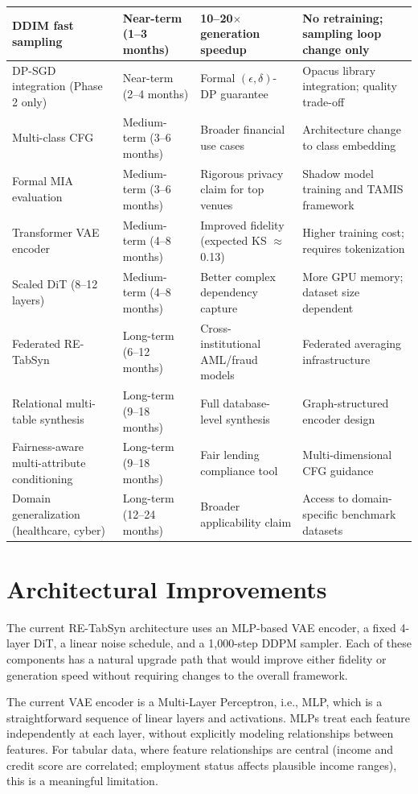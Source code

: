 \begin{xltabular}{\textwidth}{|X|X|X|X|}
DDIM fast sampling & Near-term (1--3 months) & 10--20$\times$ generation speedup & No retraining; sampling loop change only \\
\hline
DP-SGD integration (Phase 2 only) & Near-term (2--4 months) & Formal $(\epsilon, \delta)$-DP guarantee & Opacus library integration; quality trade-off \\
\hline
Multi-class CFG & Medium-term (3--6 months) & Broader financial use cases & Architecture change to class embedding \\
\hline
Formal MIA evaluation & Medium-term (3--6 months) & Rigorous privacy claim for top venues & Shadow model training and TAMIS framework \\
\hline
Transformer VAE encoder & Medium-term (4--8 months) & Improved fidelity (expected KS $\approx$ 0.13) & Higher training cost; requires tokenization \\
\hline
Scaled DiT (8--12 layers) & Medium-term (4--8 months) & Better complex dependency capture & More GPU memory; dataset size dependent \\
\hline
Federated RE-TabSyn & Long-term (6--12 months) & Cross-institutional AML/fraud models & Federated averaging infrastructure \\
\hline
Relational multi-table synthesis & Long-term (9--18 months) & Full database-level synthesis & Graph-structured encoder design \\
\hline
Fairness-aware multi-attribute conditioning & Long-term (9--18 months) & Fair lending compliance tool & Multi-dimensional CFG guidance \\
\hline
Domain generalization (healthcare, cyber) & Long-term (12--24 months) & Broader applicability claim & Access to domain-specific benchmark datasets \\
\hline

\end{xltabular}

\section{Architectural Improvements}

The current RE-TabSyn architecture uses an MLP-based VAE encoder, a fixed 4-layer DiT, a linear noise schedule, and a 1,000-step DDPM sampler. Each of these components has a natural upgrade path that would improve either fidelity or generation speed without requiring changes to the overall framework.

The current VAE encoder is a Multi-Layer Perceptron, i.e., MLP, which is a straightforward sequence of linear layers and activations. MLPs treat each feature independently at each layer, without explicitly modeling relationships between features. For tabular data, where feature relationships are central (income and credit score are correlated; employment status affects plausible income ranges), this is a meaningful limitation.

